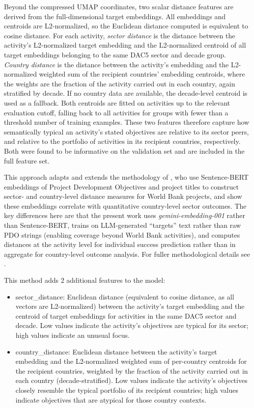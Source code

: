 Beyond the compressed UMAP coordinates, two scalar distance features are derived from the full-dimensional target embeddings. All embeddings and centroids are L2-normalized, so the Euclidean distance computed is equivalent to cosine distance. For each activity, \emph{sector distance} is the distance between the activity's L2-normalized target embedding and the L2-normalized centroid of all target embeddings belonging to the same DAC5 sector and decade group. \emph{Country distance} is the distance between the activity's embedding and the L2-normalized weighted sum of the recipient countries' embedding centroids, where the weights are the fraction of the activity carried out in each country, again stratified by decade. If no country data are available, the decade-level centroid is used as a fallback. Both centroids are fitted on activities up to the relevant evaluation cutoff, falling back to all activities for groups with fewer than a threshold number of training examples. These two features therefore capture how semantically typical an activity's stated objectives are relative to its sector peers, and relative to the portfolio of activities in its recipient countries, respectively. Both were found to be informative on the validation set and are included in the full feature set.

This approach adapts and extends the methodology of \citep{goldembergMindingGapAid2025}, who use Sentence-BERT embeddings of Project Development Objectives and project titles to construct sector- and country-level distance measures for World Bank projects, and show these embeddings correlate with quantitative country-level sector outcomes. The key differences here are that the present work uses \emph{gemini-embedding-001} rather than Sentence-BERT, trains on LLM-generated ``targets'' text rather than raw PDO strings (enabling coverage beyond World Bank activities), and computes distances at the activity level for individual success prediction rather than in aggregate for country-level outcome analysis. For fuller methodological details see \citep{goldembergMindingGapAid2025}.

This method adds 2 additional features to the model:
\begin{itemize}
  \item sector\_distance: Euclidean distance (equivalent to cosine distance, as all vectors are L2-normalized) between the activity's target embedding and the centroid of target embeddings for activities in the same DAC5 sector and decade. Low values indicate the activity's objectives are typical for its sector; high values indicate an unusual focus.
  \item country\_distance: Euclidean distance between the activity's target embedding and the L2-normalized weighted sum of per-country centroids for the recipient countries, weighted by the fraction of the activity carried out in each country (decade-stratified). Low values indicate the activity's objectives closely resemble the typical portfolio of its recipient countries; high values indicate objectives that are atypical for those country contexts.
\end{itemize}


